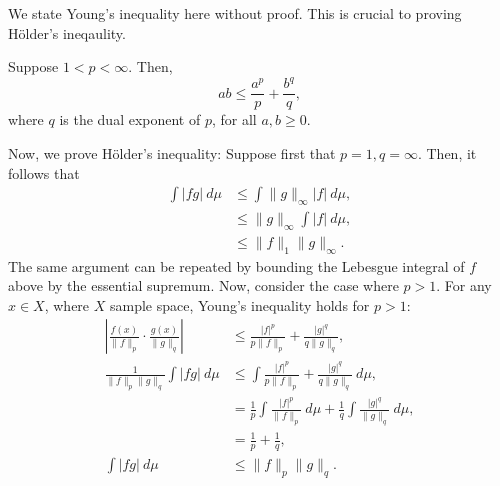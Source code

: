 \begin{problem}{12}
\end{problem}
\begin{solution}
    We state Young's inequality here without proof. This is crucial to proving Hölder's ineqaulity.
    \begin{theorem}
        Suppose $1 < p < \infty$. Then, 
        \[
            ab \leq \frac{a^p}{p} + \frac{b^{q}}{q},  
        \]
        where $q$ is the dual exponent of $p$, for all $a, b \geq 0$.
    \end{theorem}
    Now, we prove Hölder's inequality:
    Suppose first that $p=1,q=\infty$. Then, it follows that 
    \begin{align*}
        \int |fg|~d\mu &\leq \int \lVert g \rVert_\infty |f|~d\mu, \\
        &\leq \lVert g \rVert_\infty  \int |f|~d\mu, \\
        &\leq \lVert f \rVert_1 \lVert g \rVert_\infty.
    \end{align*}
    The same argument can be repeated by bounding the Lebesgue integral of $f$ above by the essential supremum. Now, consider the case where $p > 1$. For any $x\in X$, where $X$ sample space, Young's inequality holds for $p > 1$: 
    \begin{align*}
        \left| \frac{f(x)}{\lVert f \rVert_p} \cdot \frac{g(x)}{\lVert g \rVert_q} \right| &\leq \frac{|f|^p}{p\lVert f\rVert_p} + \frac{|g|^q}{q\lVert g\rVert_q}, \\
        \frac{1}{\lVert f\rVert_p \lVert g \rVert_q}\int |fg|~d\mu &\leq \int \frac{|f|^p}{p\lVert f\rVert_p} + \frac{|g|^q}{q\lVert g\rVert_q}~d\mu, \\
        &= \frac{1}{p} \int \frac{|f|^p}{\lVert f\rVert_p}~d\mu + \frac{1}{q} \int \frac{|g|^q}{\lVert g\rVert_q}~d\mu, \\
        &= \frac{1}{p} + \frac{1}{q}, \\
        \int |fg|~d\mu &\leq \lVert f \rVert_p \lVert g \rVert_q.
    \end{align*}
\end{solution}

\begin{problem}{13}
\end{problem}
\begin{solution}
\end{solution}